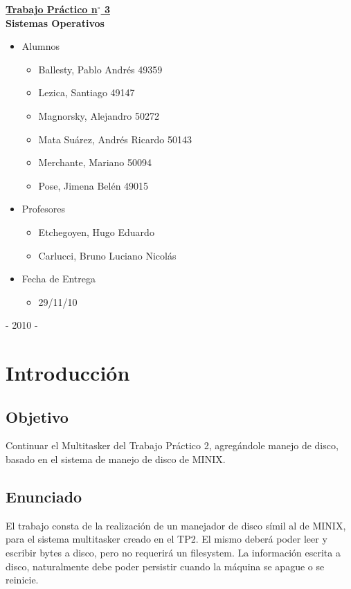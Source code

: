 \documentclass[a4paper,10pt]{article}
\begin{document}
\begin{center}
\underline{\textbf{\Large{Trabajo Práctico n$^{\circ}$ 3}}} \\
\bigskip
\textbf{\large{Sistemas Operativos}}
\bigskip\bigskip\bigskip\bigskip\bigskip
\begin{itemize}
\item Alumnos
\begin{itemize}
\item Ballesty, Pablo Andrés 		49359
\item Lezica, Santiago			49147
\item Magnorsky, Alejandro		50272
\item Mata Suárez, Andrés Ricardo 	50143
\item Merchante, Mariano		50094
\item Pose, Jimena Belén		49015
\end{itemize}
\bigskip\bigskip\bigskip\bigskip
\item Profesores
\begin{itemize}
\item Etchegoyen, Hugo Eduardo
\item Carlucci, Bruno Luciano Nicolás
\end{itemize}
\bigskip\bigskip\bigskip\bigskip
\item Fecha de Entrega
\begin{itemize}
\item 29/11/10
\end{itemize}
\end{itemize}
\bigskip\bigskip\bigskip\bigskip\bigskip\bigskip
\bigskip\bigskip\bigskip\bigskip\bigskip\bigskip

- 2010 -\end{center}

\newpage
\tableofcontents

\newpage
\section{Introducción}
\subsection{Objetivo}
\par
Continuar el Multitasker del Trabajo Práctico 2, agregándole manejo de disco,
basado en el sistema de manejo de disco de MINIX.


\subsection{Enunciado}
\par
El trabajo consta de la realización de un manejador de disco símil al de MINIX,
para el sistema multitasker creado en el TP2. El mismo deberá poder leer y
escribir bytes a disco, pero no requerirá un filesystem. La información escrita
a disco, naturalmente debe poder persistir cuando la máquina se apague o se
reinicie.
\end{document}
